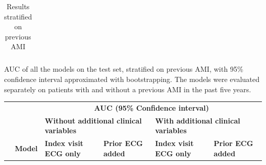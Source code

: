\documentclass[preprint]{elsarticle}
\begin{document}
\begin{table}[H]
\begin{adjustbox}{center}
\begin{tabular}{@{}llcccc@{}}
\bottomrule
\end{tabular}
\end{adjustbox}
\caption{Results stratified on previous AMI}
\medskip
\small
AUC of all the models on the test set, stratified on previous AMI, with 95\% confidence interval approximated with bootstrapping. The models were evaluated separately on patients with and without a previous AMI in the past five years. 
\label{table:appendix:ami}
\end{table}
\renewcommand{\arraystretch}{1}




\renewcommand{\arraystretch}{1.2}
\begin{table}[H]
  \centering
  \scriptsize
\begin{adjustbox}{center}
\begin{tabular}{@{}llcccc@{}}
  \toprule
  & & \multicolumn{4}{c}{\textbf{AUC (95\% Confidence interval)}} \\
  \cmidrule(lr){3-6}
  & & \multicolumn{2}{l}{\textbf{Without additional clinical variables}} & \multicolumn{2}{l}{\textbf{With additional clinical variables}} \\
  \cmidrule(lr){3-4}\cmidrule(lr){5-6}
  & \multicolumn{1}{l}{\textbf{Model}} & \multicolumn{1}{l}{\textbf{Index visit ECG only}} & \multicolumn{1}{l}{\textbf{Prior ECG added}} & \multicolumn{1}{l}{\textbf{Index visit ECG only}} & \multicolumn{1}{l}{\textbf{Prior ECG added}} \\
  \midrule


\end{tabular}
\end{adjustbox}
\end{table}
\end{document}
